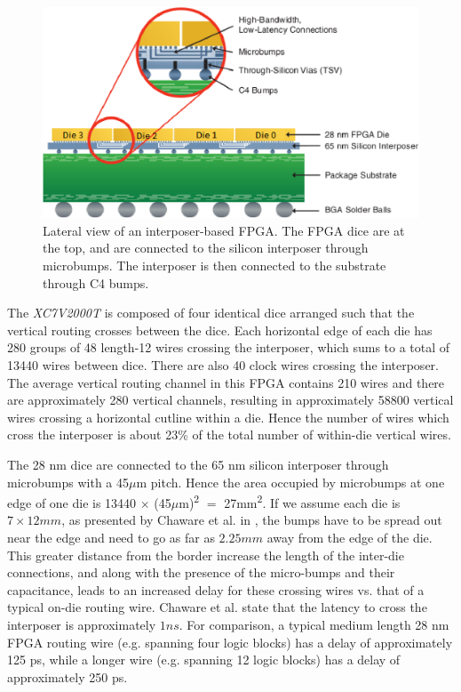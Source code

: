 \documentclass[journal]{IEEEtran}
\begin{document}
\begin{figure}[!htbp]
\centering
\includegraphics[width=\linewidth]{interposer.eps}
\caption{Lateral view of an interposer-based FPGA\cite{xilinxWP}. The FPGA dice are at the top, and are connected to the silicon interposer through microbumps. The interposer is then connected to the substrate through C4 bumps.}
\label{fig:interposer}
\end{figure}


The \textit{XC7V2000T} is composed of four identical dice arranged such that the vertical routing crosses between the dice. Each horizontal edge of each die has 280 groups of 48 length-12 wires crossing the interposer, which sums to a total of 13440 wires between dice. There are also 40 clock wires crossing the interposer. The average vertical routing channel in this FPGA contains 210 wires and there are approximately 280 vertical channels, resulting in approximately 58800 vertical wires crossing a horizontal cutline within a die. Hence the number of wires which cross the interposer is about 23\% of the total number of within-die vertical wires.

The 28 nm dice are connected to the 65 nm silicon interposer through microbumps with a 45$\mu$m pitch. Hence the area occupied by microbumps at one edge of one die is 13440 $\times$ (45$\mu$m)\textsuperscript{2} $=$ 27mm\textsuperscript{2}. If we assume each die is $7 \times 12 mm$, as presented by Chaware et al. in \cite{xilinxTSV}, the bumps have to be spread out near the edge and need to go as far as $2.25mm$ away from the edge of the die. This greater distance from the border increase the length of the inter-die connections, and along with the presence of the micro-bumps and their capacitance, leads to an increased delay for these crossing wires vs. that of a typical on-die routing wire. Chaware et al. state that the latency to cross the interposer is approximately $1ns$. For comparison, a typical medium length 28 nm FPGA routing wire (e.g. spanning four logic blocks) has a delay of approximately 125 ps, while a longer wire (e.g. spanning 12 logic blocks) has a delay of approximately 250 ps.
\end{document}
